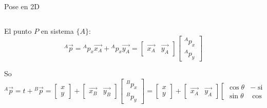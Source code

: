 \documentclass[presentation,aspectratio=169]{beamer}
\newcommand*{\vecref}[2]{\ensuremath{^#2 \vec{#1}}}
\newcommand*{\pref}[2]{\ensuremath{^#2{#1}}}
\newcommand*{\refsys}[1]{\ensuremath{\{#1\}}}
\begin{document}
\begin{frame}[label={sec:org90995d3}]{Pose en 2D}
\begin{columns}
\begin{column}{0.8\columnwidth}
\pause

El punto \(P\) en sistema \refsys{A}: \[  \vecref{p}{A} = \pref{p_x}{A} \vec{x_A} + \pref{p_x}{A} \vec{y_A} =
 \begin{bmatrix} \vec{x_A} & \vec{y_A} \end{bmatrix} \begin{bmatrix} \pref{p_x}{A}\\ \pref{p_y}{A} \end{bmatrix} \]

\pause

So
\[\vecref{p}{A} = t + \vecref{p}{B} = \begin{bmatrix}x\\y\end{bmatrix} + \begin{bmatrix} \vec{x_B} & \vec{y_B} \end{bmatrix} \begin{bmatrix} \pref{p_x}{B}\\ \pref{p_y}{B} \end{bmatrix} =
\begin{bmatrix}x\\y\end{bmatrix} + \begin{bmatrix} \vec{x_A} & \vec{y_A} \end{bmatrix} \begin{bmatrix} \cos\theta & -\sin\theta\\\sin\theta & \cos\theta \end{bmatrix} \begin{bmatrix} \pref{p_x}{B}\\ \pref{p_y}{B} \end{bmatrix}\]
\end{column}
\end{columns}
\end{frame}
\end{document}

